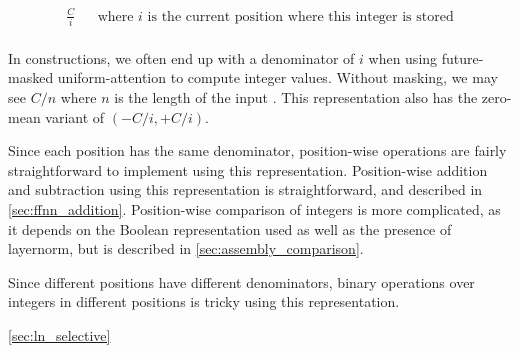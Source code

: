   \begin{align*}
    \frac{C}{i} & & \text{where $i$ is the current position where this integer is stored}\\
  \end{align*}

In constructions, we often end up with a denominator of $i$ when using future-masked uniform-attention to compute integer values.
Without masking, we may see $C/n$ where $n$ is the length of the input \cite{chiang+:icml2023}.
This representation also has the zero-mean variant of $(-C/i, +C/i)$.

Since each position has the same denominator, position-wise operations are fairly straightforward to implement using this representation. Position-wise addition and subtraction using this representation is straightforward, and described in \cref{sec:ffnn_addition}. Position-wise comparison of integers is more complicated, as it depends on the Boolean representation used as well as the presence of layernorm, but is described in \cref{sec:assembly_comparison}.

Since different positions have different denominators,  binary operations over integers in different positions is tricky using this representation.

\cref{sec:ln_selective}


